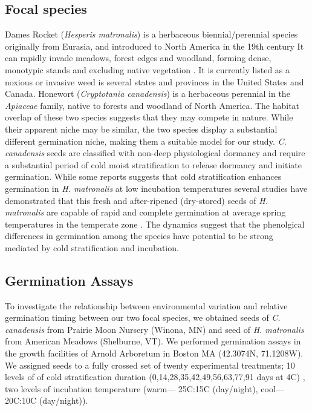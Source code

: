\documentclass{article}\usepackage[]{graphicx}\usepackage[]{color}
\begin{document}
\subsection{Focal species}
 Dames Rocket (\textit{Hesperis matronalis}) is a herbaceous biennial/perennial species originally from Eurasia, and introduced to North America in the 19th century \citep{Francis} It  can rapidly invade  meadows, forest edges and woodland, forming dense, monotypic stands and excluding native vegetation \citep{}. It is currently listed as a noxious or invasive weed is several states and provinces in the United States and Canada. Honewort (\textit{Cryptotania canadensis}) is a herbaceous perennial in the \textit{Apiaceae} family, native to forests and woodland of North America. The  habitat overlap of these two species suggests that they may compete in nature. While their apparent niche may be similar, the two species display a substantial different germination niche, making them a suitable model for our study. \textit{C. canadensis} seeds are classified with non-deep physiological dormancy and require a substantial  period of cold moist stratification to release dormancy and initiate germination. While some reports suggests that cold stratification enhances germination in \textit{H. matronalis} at low incubation temperatures \citep{} several studies have demonstrated that this fresh and after-ripened (dry-stored) seeds of \textit{H. matronalis} are capable of rapid and complete germination at average spring temperatures in the temperate zone \citep{}. The dynamics suggest that the phenolgical differences in germination among the species have potential to be strong mediated by cold stratification and incubation.  

\subsection{Germination Assays}
To investigate the relationship between environmental variation and relative germination timing between our two focal species, we obtained seeds of \textit{C. canadensis} from Prairie Moon Nursery (Winona, MN) and seed of \textit{H. matronalis} from American Meadows (Shelburne, VT). We performed germination assays in the growth facilities of Arnold Arboretum in Boston MA (42.3074\degree N, 71.1208\degree W). We assigned seeds to a fully crossed set of twenty experimental treatments; 10 levels of of cold stratification duration (0,14,28,35,42,49,56,63,77,91 days at 4\degree C) , two levels of incubation temperature (warm--- 25\degree C:15\degree C (day/night), cool--- 20\degree C:10\degree C (day/night)).
\end{document}
